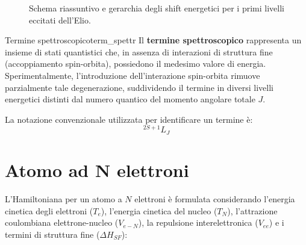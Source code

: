\begin{figure}[htbp]
{
    }
    \caption{Schema riassuntivo e gerarchia degli shift energetici per i primi livelli eccitati dell'Elio.}
    \label{fig:elio_all_interactions}
\end{figure}

\begin{note}{Termine spettroscopico}{term_spettr}
    Il \textbf{termine spettroscopico} rappresenta un insieme di stati quantistici che, in assenza di interazioni di struttura fine (accoppiamento spin-orbita), possiedono il medesimo valore di energia. Sperimentalmente, l'introduzione dell'interazione spin-orbita rimuove parzialmente tale degenerazione, suddividendo il termine in diversi livelli energetici distinti dal numero quantico del momento angolare totale \( J \).

La notazione convenzionale utilizzata per identificare un termine è:
\begin{equation}
^{2S+1}L_J
\end{equation}

\end{note}

\section{Atomo ad N elettroni}

L'Hamiltoniana per un atomo a \( N \) elettroni è formulata considerando l'energia cinetica degli elettroni (\( T_e \)), l'energia cinetica del nucleo (\( T_N \)), l'attrazione coulombiana elettrone-nucleo (\( V_{e-N} \)), la repulsione interelettronica (\( V_{ee} \)) e i termini di struttura fine (\( \Delta H_{SF} \)):

